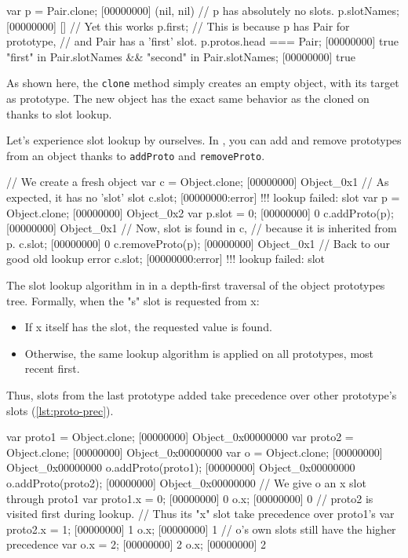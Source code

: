 \documentclass[openright,twoside,12pt]{report}
\begin{document}
\begin{urbiscript}[caption=Slot found by lookup, label=lst:simple-lookup]
var p = Pair.clone;
[00000000] (nil, nil)
// p has absolutely no slots.
p.slotNames;
[00000000] []
// Yet this works
p.first;
// This is because p has Pair for prototype,
// and Pair has a 'first' slot.
p.protos.head === Pair;
[00000000] true
"first" in Pair.slotNames && "second" in Pair.slotNames;
[00000000] true
\end{urbiscript}

As shown here, the \texttt{clone} method simply creates an empty
object, with its target as prototype. The new object has the exact
same behavior as the cloned on thanks to slot lookup.

Let's experience slot lookup by ourselves. In \urbi, you can add and
remove prototypes from an object thanks to \texttt{addProto} and
\texttt{removeProto}.

\begin{urbiscript}[caption=Manipulating prototypes, label=lst:proto-change]
// We create a fresh object
var c = Object.clone;
[00000000] Object_0x1
// As expected, it has no 'slot' slot
c.slot;
[00000000:error] !!! lookup failed: slot
var p = Object.clone;
[00000000] Object_0x2
var p.slot = 0;
[00000000] 0
c.addProto(p);
[00000000] Object_0x1
// Now, slot is found in c,
// because it is inherited from p.
c.slot;
[00000000] 0
c.removeProto(p);
[00000000] Object_0x1
// Back to our good old lookup error
c.slot;
[00000000:error] !!! lookup failed: slot
\end{urbiscript}

The slot lookup algorithm in \urbi in a depth-first traversal of the
object prototypes tree. Formally, when the "s" slot is requested from
x:

\begin{itemize}
\item If x itself has the slot, the requested value is found.
\item Otherwise, the same lookup algorithm is applied on all
  prototypes, most recent first.
\end{itemize}

Thus, slots from the last prototype added take precedence over other
prototype's slots (\autoref{lst:proto-prec}).

\begin{urbiscript}[caption=Prototype precedence, label=lst:proto-prec]
var proto1 = Object.clone;
[00000000] Object_0x00000000
var proto2 = Object.clone;
[00000000] Object_0x00000000
var o = Object.clone;
[00000000] Object_0x00000000
o.addProto(proto1);
[00000000] Object_0x00000000
o.addProto(proto2);
[00000000] Object_0x00000000
// We give o an x slot through proto1
var proto1.x = 0;
[00000000] 0
o.x;
[00000000] 0
// proto2 is visited first during lookup.
// Thus its "x" slot take precedence over proto1's
var proto2.x = 1;
[00000000] 1
o.x;
[00000000] 1
// o's own slots still have the higher precedence
var o.x = 2;
[00000000] 2
o.x;
[00000000] 2
\end{urbiscript}
\end{document}
